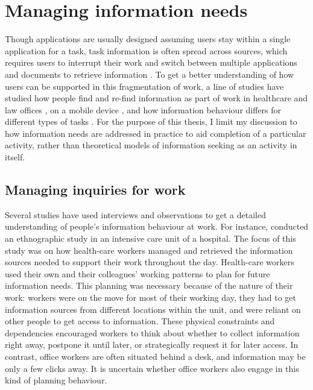 \section{Managing information needs}
Though applications are usually designed assuming users stay within a single application for a task, task information is often spread across sources, which requires users to interrupt their work and switch between multiple applications and documents to retrieve information \citep{Cangiano2009, Czerwinski2004, Mark2005, Sellberg2014}. To get a better understanding of how users can be supported in this fragmentation of work, a line of studies have studied how people find and re-find information as part of work in healthcare \citep{Reddy2002} and law offices \citep{Cangiano2009, Makri2008b}, on a mobile device \citep{Sohn2008}, and how information behaviour differs for different types of tasks \citep{Bondarenko2005}. For the purpose of this thesis, I limit my discussion to how information needs are addressed in practice to aid completion of a particular activity, rather than theoretical models of information seeking as an activity in itself.

\subsection{Managing inquiries for work}
Several studies have used interviews and observations to get a detailed understanding of people's information behaviour at work. For instance, \citet{Reddy2002} conducted an ethnographic study in an intensive care unit of a hospital. The focus of this study was on how health-care workers managed and retrieved the information sources needed to support their work throughout the day. Health-care workers used their own and their colleagues' working patterns to plan for future information needs. This planning was necessary because of the nature of their work: workers were on the move for most of their working day, they had to get information sources from different locations within the unit, and were reliant on other people to get access to information. These physical constraints and dependencies encouraged workers to think about whether to collect information right away, postpone it until later, or strategically request it for later access. In contrast, office workers are often situated behind a desk, and information may be only a few clicks away. It is uncertain whether office workers also engage in this kind of planning behaviour. 

